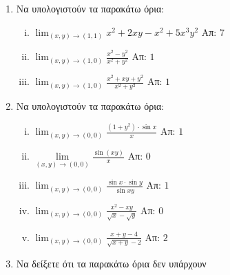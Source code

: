 



\pagestyle{askhseis}
\everymath{\displaystyle}




\begin{center}
  {\color{Col2}}
\end{center}


\vspace{\baselineskip}

\begin{enumerate}
  \item Να υπολογιστούν τα παρακάτω όρια:
    \begin{enumerate}[(i)]
      \item $ \lim_{(x,y) \to (1,1)} x^{2}+2xy-x^{2}+5x^{3}y^{2} $ \hfill Απ: $ 7 $ 
      \item $ \lim_{(x,y) \to (1,0)} \frac{x^{2}-y^{2}}{x^{2}+y^{2}}$ \hfill Απ: $ 1 $ 
      \item $ \lim_{(x,y) \to (1,0)} \frac{x^{2}+xy+y^{2}}{x^{2}+y^{2}}$ \hfill Απ: $1$ 
    \end{enumerate}
  \item Να υπολογιστούν τα παρακάτω όρια:
    \begin{enumerate}[(i)]
      \item $ \lim_{(x,y)\to (0,0)} \frac{ (1+y^{2})\cdot \sin{x} }{ x } $ 
        \hfill Απ: $ 1 $
      \item $\lim\limits_{(x,y)\to (0,0)}\frac{\sin(xy)}{x}$ \hfill Απ: $0$
      \item $ \lim_{(x,y)\to (0,0)} \frac{ \sin{x} \cdot \sin{y} }{ \sin{xy} } $ 
        \hfill Απ: $ 1 $
      \item $ \lim_{(x,y)\to (0,0)} \frac{x^{2}-xy}{\sqrt{x} - \sqrt{y}} $ 
        \hfill Απ: $ 0 $
      \item $ \lim_{(x,y)\to (0,0)} \frac{x+y-4}{\sqrt{x+y} - 2} $ 
        \hfill Απ: $ 2 $
    \end{enumerate}

  \item Να δείξετε ότι τα παρακάτω όρια δεν υπάρχουν


\end{enumerate}
